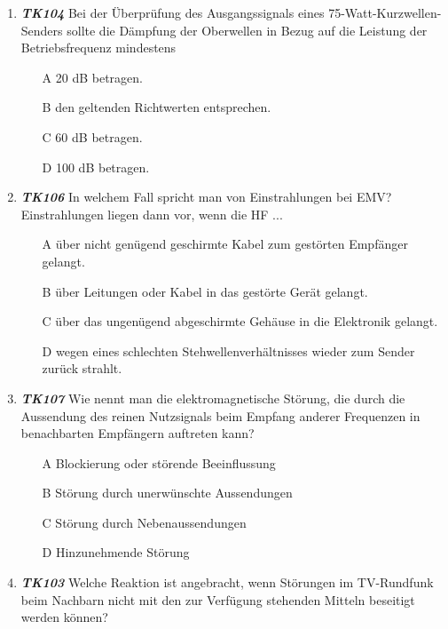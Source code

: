 \begin{enumerate} 
	\item \emph{\textbf{TK104}} Bei der Überprüfung des Ausgangssignals eines 75-Watt-Kurzwellen-Senders sollte die Dämpfung der Oberwellen in Bezug auf die Leistung der Betriebsfrequenz mindestens
	\begin{enumerate}
	\itemsep1pt\parskip0pt
		\item[A] 20 dB betragen.
		\item[B] den geltenden Richtwerten entsprechen.
		\item[C] 60 dB betragen.
		\item[D] 100 dB betragen.
		\end{enumerate} 
	\item \emph{\textbf{TK106}} In welchem Fall spricht man von Einstrahlungen bei EMV? Einstrahlungen liegen dann vor, wenn die HF ...
	\begin{enumerate}
	\itemsep1pt\parskip0pt
		\item[A] über nicht genügend geschirmte Kabel zum gestörten Empfänger gelangt. 
		\item[B] über Leitungen oder Kabel in das gestörte Gerät gelangt.
		\item[C]   über das ungenügend abgeschirmte Gehäuse in die Elektronik gelangt.
		\item[D]  wegen eines schlechten Stehwellenverhältnisses wieder zum Sender zurück strahlt.
		\end{enumerate}
	\item \emph{\textbf{TK107}} Wie nennt man die elektromagnetische Störung, die durch die Aussendung des reinen Nutzsignals beim Empfang anderer Frequenzen in benachbarten Empfängern auftreten kann?
	\begin{enumerate}
	\itemsep1pt\parskip0pt
		\item[A] Blockierung oder störende Beeinflussung
		\item[B] Störung durch unerwünschte Aussendungen
		\item[C]  Störung durch Nebenaussendungen
		\item[D]  Hinzunehmende Störung
		\end{enumerate}
	\item \emph{\textbf{TK103}} Welche Reaktion ist angebracht, wenn Störungen im TV-Rundfunk beim Nachbarn nicht mit den zur Verfügung stehenden Mitteln beseitigt werden können?
	\begin{enumerate}

\end{enumerate}
\end{enumerate}
